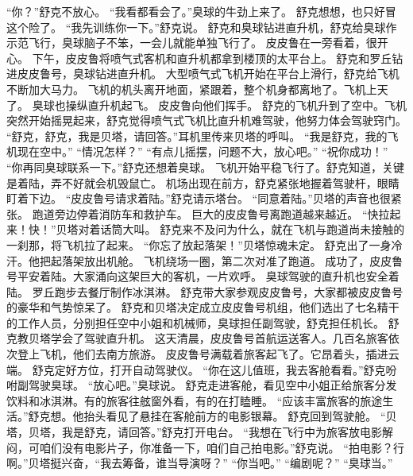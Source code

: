 \documentclass[a4paper,12pt,UTF8,twoside]{ctexbook}
\begin{document}
        “你？”舒克不放心。 
        “我看都看会了。”臭球的牛劲上来了。 
        舒克想想，也只好冒这个险了。 
        “我先训练你一下。”舒克说。 
        舒克和臭球钻进直升机，舒克给臭球作示范飞行，臭球脑子不笨，一会儿就能单独飞行了。 
        皮皮鲁在一旁看着，很开心。 
        下午，皮皮鲁将喷气式客机和直升机都拿到楼顶的太平台上。 
        舒克和罗丘钻进皮皮鲁号，臭球钻进直升机。 
        大型喷气式飞机开始在平台上滑行，舒克给飞机不断加大马力。 
        飞机的机头离开地面，紧跟着，整个机身都离地了。飞机上天了。 
        臭球也操纵直升机起飞。 
        皮皮鲁向他们挥手。 
        舒克的飞机升到了空中。飞机突然开始摇晃起来，舒克觉得喷气式飞机比直升机难驾驶，他努力体会驾驶窍门。 
        “舒克，舒克，我是贝塔，请回答。”耳机里传来贝塔的呼叫。 
        “我是舒克，我的飞机现在空中。” 
        “情况怎样？” 
        “有点儿摇摆，问题不大，放心吧。” 
        “祝你成功！” 
        “你再同臭球联系一下。”舒克还想着臭球。 
        飞机开始平稳飞行了。舒克知道，关键是着陆，弄不好就会机毁鼠亡。 
        机场出现在前方，舒克紧张地握着驾驶杆，眼睛盯着下边。 
        “皮皮鲁号请求着陆。”舒克请示塔台。 
        “同意着陆。”贝塔的声音也很紧张。 
        跑道旁边停着消防车和救护车。 
        巨大的皮皮鲁号离跑道越来越近。 
        “快拉起来！快！”贝塔对着话筒大叫。 
        舒克来不及问为什么，就在飞机与跑道尚未接触的一刹那，将飞机拉了起来。 
        “你忘了放起落架！”贝塔惊魂未定。 
        舒克出了一身冷汗。他把起落架放出机舱。 
        飞机绕场一圈，第二次对准了跑道。 
        成功了，皮皮鲁号平安着陆。大家涌向这架巨大的客机，一片欢呼。 
        臭球驾驶的直升机也安全着陆。 
        罗丘跑步去餐厅制作冰淇淋。 
        舒克带大家参观皮皮鲁号，大家都被皮皮鲁号的豪华和气势惊呆了。 
        舒克和贝塔决定成立皮皮鲁号机组，他们选出了七名精干的工作人员，分别担任空中小姐和机械师，臭球担任副驾驶，舒克担任机长。 
        舒克教贝塔学会了驾驶直升机。 
        这天清晨，皮皮鲁号首航运送客人。几百名旅客依次登上飞机，他们去南方旅游。 
        皮皮鲁号满载着旅客起飞了。它昂着头，插进云端。 
        舒克定好方位，打开自动驾驶仪。 
        “你在这儿值班，我去客舱看看。”舒克吩咐副驾驶臭球。 
        “放心吧。”臭球说。 
        舒克走进客舱，看见空中小姐正给旅客分发饮料和冰淇淋。有的旅客往舷窗外看，有的在打瞌睡。 
        “应该丰富旅客的旅途生活。”舒克想。他抬头看见了悬挂在客舱前方的电影银幕。 
        舒克回到驾驶舱。 
        “贝塔，贝塔，我是舒克，请回答。”舒克打开电台。 
        “我想在飞行中为旅客放电影解闷，可咱们没有电影片子，你准备一下，咱们自己拍电影。”舒克说。 
        “拍电影？行啊。”贝塔挺兴奋，“我去筹备，谁当导演呀？” 
        “你当吧。” 
        “编剧呢？” 
        “臭球当。” 
\end{document}
